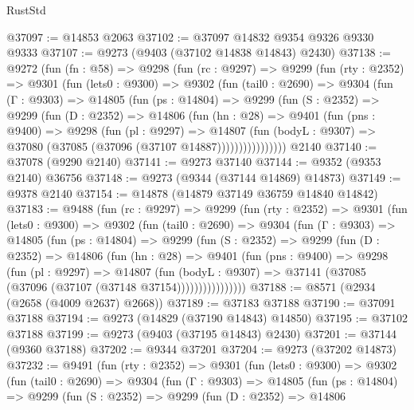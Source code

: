 \begin{lexlean}{RustStd}
\begin{coremodule}
{\begin{coremodule}
{{{{{{{{{{{{{{{{{{{{{{{{{{{{{{{{{{{{{{{{{{{{{{{{{{{{{{{@37097 := @14853 @2063
@37102 := @37097 @14832 @9354 @9326 @9330 @9333
@37107 := @9273 (@9403 (@37102 @14838 @14843) @2430)
@37138 := @9272
    (fun (fn : @58) =>
    @9298
      (fun (rc : @9297) =>
      @9299
        (fun (rty : @2352) =>
        @9301
          (fun (lets0 : @9300) =>
          @9302
            (fun (tail0 : @2690) =>
            @9304
              (fun (Γ : @9303) =>
              @14805
                (fun (ps : @14804) =>
                @9299
                  (fun (S : @2352) =>
                  @9299
                    (fun (D : @2352) =>
                    @14806
                      (fun (hn : @28) =>
                      @9401
                        (fun (pns : @9400) =>
                        @9298
                          (fun (pl : @9297) =>
                          @14807
                            (fun (bodyL : @9307) =>
                            @37080 (@37085 (@37096 (@37107 @14887))))))))))))))))
    @2140
@37140 := @37078 (@9290 @2140)
@37141 := @9273 @37140
@37144 := @9352 (@9353 @2140) @36756
@37148 := @9273 (@9344 (@37144 @14869) @14873)
@37149 := @9378 @2140
@37154 := @14878 (@14879 @37149 @36759 @14840 @14842)
@37183 := @9488
    (fun (rc : @9297) =>
    @9299
      (fun (rty : @2352) =>
      @9301
        (fun (lets0 : @9300) =>
        @9302
          (fun (tail0 : @2690) =>
          @9304
            (fun (Γ : @9303) =>
            @14805
              (fun (ps : @14804) =>
              @9299
                (fun (S : @2352) =>
                @9299
                  (fun (D : @2352) =>
                  @14806
                    (fun (hn : @28) =>
                    @9401
                      (fun (pns : @9400) =>
                      @9298
                        (fun (pl : @9297) =>
                        @14807
                          (fun (bodyL : @9307) =>
                          @37141 (@37085 (@37096 (@37107 (@37148 @37154))))))))))))))))
@37188 := @8571 (@2934 (@2658 (@4009 @2637) @2668))
@37189 := @37183 @37188
@37190 := @37091 @37188
@37194 := @9273 (@14829 (@37190 @14843) @14850)
@37195 := @37102 @37188
@37199 := @9273 (@9403 (@37195 @14843) @2430)
@37201 := @37144 (@9360 @37188)
@37202 := @9344 @37201
@37204 := @9273 (@37202 @14873)
@37232 := @9491
    (fun (rty : @2352) =>
    @9301
      (fun (lets0 : @9300) =>
      @9302
        (fun (tail0 : @2690) =>
        @9304
          (fun (Γ : @9303) =>
          @14805
            (fun (ps : @14804) =>
            @9299
              (fun (S : @2352) =>
              @9299
                (fun (D : @2352) =>
                @14806
}}}}}}}}}}}}}}}}}}}}}}}}}}}}}}}}}}}}}}}}}}}}}}}}}}}}}}}
\end{coremodule}}
\end{coremodule}
\end{lexlean}
